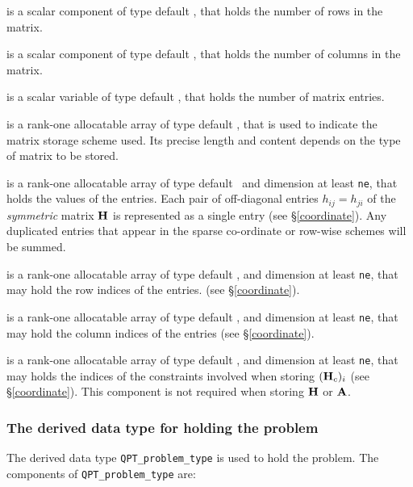 \documentclass{galahad}
\begin{document}
\begin{description}

 is a scalar component of type default \integer,
that holds the number of rows in the matrix.

 is a scalar component of type default \integer,
that holds the number of columns in the matrix.

 is a scalar variable of type default \integer, that
holds the number of matrix entries.

 is a rank-one allocatable array of type default \character, that
is used to indicate the matrix storage scheme used. Its precise length and
content depends on the type of matrix to be stored.

 is a rank-one allocatable array of type default \realdp\,
and dimension at least {\tt ne}, that holds the values of the entries.
Each pair of off-diagonal entries $h_{ij} = h_{ji}$ of the {\em symmetric}
matrix ${\mathbf{H}}$ is represented as a single entry
(see \S\ref{coordinate}).
Any duplicated entries that appear in the sparse
co-ordinate or row-wise schemes will be summed.

 is a rank-one allocatable array of type default \integer,
and dimension at least {\tt ne}, that may hold the row indices of the entries.
(see \S\ref{coordinate}).

 is a rank-one allocatable array of type default \integer,
and dimension at least {\tt ne}, that may hold the column indices of the entries
(see \S\ref{coordinate}).

 is a rank-one allocatable array of type default \integer,
and dimension at least {\tt ne}, that may holds the indices of the
constraints involved when storing $({\mathbf{H}}_c)_i$
(see \S\ref{coordinate}).
This component is not required when storing ${\mathbf{H}}$ or ${\mathbf{A}}$.

\end{description}


\subsubsection{The derived data type for holding the problem}\label{typeprob}
The derived data type {\tt QPT\_problem\_type} is used to hold
the problem. The components of
{\tt QPT\_problem\_type}
are:
\end{document}
